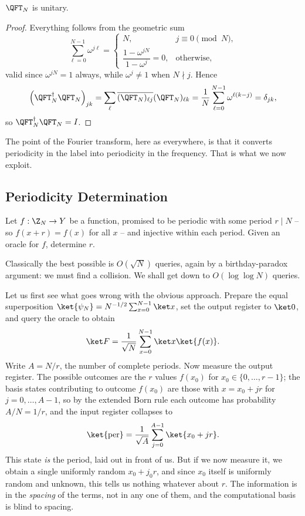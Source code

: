 \begin{proposition}
	$\QFT_N$ is unitary.
\end{proposition}

\begin{proof}
	Everything follows from the geometric sum
	$$\sum_{\ell=0}^{N-1}\omega^{j\ell} = \begin{cases} N, & j\equiv0 \pmod N,\\ \dfrac{1-\omega^{jN}}{1-\omega^j} = 0, &\text{otherwise,}\end{cases}$$
	valid since $\omega^{jN} = 1$ always, while $\omega^j\neq1$ when $N\nmid j$. Hence
	$$\left(\QFT_N^\dagger\QFT_N\right)_{jk} = \sum_{\ell}\overline{(\QFT_N)_{\ell j}}(\QFT_N)_{\ell k} = \frac1N\sum_{\ell=0}^{N-1}\omega^{\ell(k-j)} = \delta_{jk},$$
	so $\QFT_N^\dagger \QFT_N = I$.
\end{proof}

The point of the Fourier transform, here as everywhere, is that it converts periodicity in the label into periodicity in the frequency. That is what we now exploit.

\subsection{Periodicity Determination}\label{sec:period}

\begin{problem*}
	Let $f:\Z_N\to Y$ be a function, promised to be periodic with some period $r\mid N$ -- so $f(x+r) = f(x)$ for all $x$ -- and injective within each period. Given an oracle for $f$, determine $r$.
\end{problem*}

Classically the best possible is $O(\sqrt N)$ queries, again by a birthday-paradox argument: we must find a collision. We shall get down to $O(\log\log N)$ queries.

Let us first see what goes wrong with the obvious approach. Prepare the equal superposition $\ket{\psi_N} = N^{-1/2}\sum_{x=0}^{N-1}\ket x$, set the output register to $\ket0$, and query the oracle to obtain
$$\ket F = \frac1{\sqrt N}\sum_{x=0}^{N-1}\ket x\ket{f(x)}.$$
Write $A = N/r$, the number of complete periods. Now measure the output register. The possible outcomes are the $r$ values $f(x_0)$ for $x_0\in\{0,\dots,r-1\}$; the basis states contributing to outcome $f(x_0)$ are those with $x = x_0 + jr$ for $j = 0,\dots,A-1$, so by the extended Born rule each outcome has probability $A/N = 1/r$, and the input register collapses to
$$\ket{\mathrm{per}} = \frac1{\sqrt A}\sum_{j=0}^{A-1}\ket{x_0+jr}.$$
This state \emph{is} the period, laid out in front of us. But if we now measure it, we obtain a single uniformly random $x_0 + j_0r$, and since $x_0$ itself is uniformly random and unknown, this tells us nothing whatever about $r$. The information is in the \emph{spacing} of the terms, not in any one of them, and the computational basis is blind to spacing.

